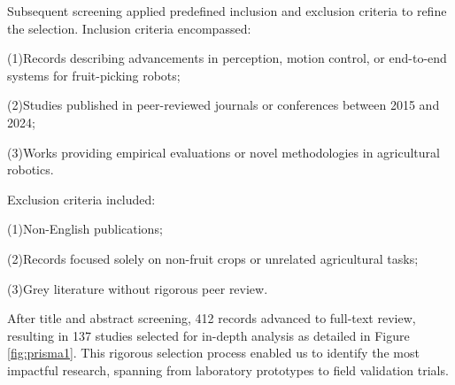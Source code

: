 \documentclass{ieeeaccess}
\begin{document}

Subsequent screening applied predefined inclusion and exclusion criteria to refine the selection. Inclusion criteria encompassed:

(1)Records describing advancements in perception, motion control, or end-to-end systems for fruit-picking robots;

(2)Studies published in peer-reviewed journals or conferences between 2015 and 2024;

(3)Works providing empirical evaluations or novel methodologies in agricultural robotics.

Exclusion criteria included:

(1)Non-English publications;

(2)Records focused solely on non-fruit crops or unrelated agricultural tasks;

(3)Grey literature without rigorous peer review.

After title and abstract screening, 412 records advanced to full-text review, resulting in 137 studies selected for in-depth analysis as detailed in Figure \ref{fig:prisma1}. This rigorous selection process enabled us to identify the most impactful research, spanning from laboratory prototypes to field validation trials. 

\end{document}
